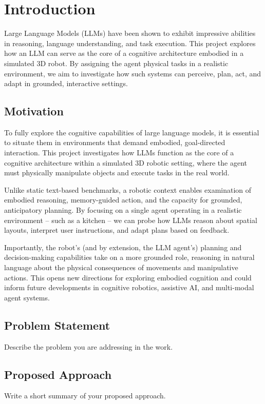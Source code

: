 \documentclass[../report.tex]{subfiles}
\begin{document}
    \section{Introduction}
    \label{sec:introduction}

    Large Language Models (LLMs) have been shown to exhibit impressive abilities in reasoning, language understanding, and task execution. This project explores how an LLM can serve as the core of a cognitive architecture embodied in a simulated 3D robot. By assigning the agent physical tasks in a realistic environment, we aim to investigate how such systems can perceive, plan, act, and adapt in grounded, interactive settings.

    \subsection{Motivation}
    \label{sec:introduction:motivation}

    To fully explore the cognitive capabilities of large language models, it is essential to situate them in environments that demand embodied, goal-directed interaction. This project investigates how LLMs function as the core of a cognitive architecture within a simulated 3D robotic setting, where the agent must physically manipulate objects and execute tasks in the real world.

    Unlike static text-based benchmarks, a robotic context enables examination of embodied reasoning, memory-guided action, and the capacity for grounded, anticipatory planning. By focusing on a single agent operating in a realistic environment -- such as a kitchen -- we can probe how LLMs reason about spatial layouts, interpret user instructions, and adapt plans based on feedback.

    Importantly, the robot's (and by extension, the LLM agent's) planning and decision-making capabilities take on a more grounded role, reasoning in natural language about the physical consequences of movements and manipulative actions. This opens new directions for exploring embodied cognition and could inform future developments in cognitive robotics, assistive AI, and multi-modal agent systems.

    \subsection{Problem Statement}
    \label{sec:introduction:problem_statement}

    Describe the problem you are addressing in the work.

    \subsection{Proposed Approach}
    \label{sec:introduction:proposed_approach}

    Write a short summary of your proposed approach.
\end{document}
